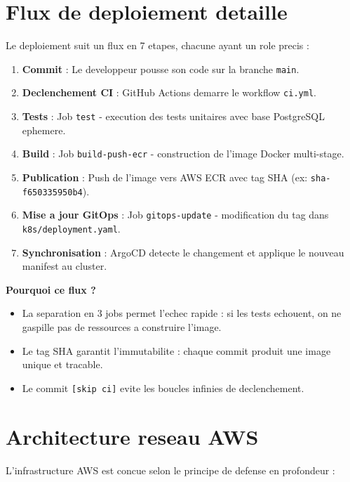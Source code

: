 \documentclass[12pt,a4paper,french]{report}
\begin{document}
\section{Flux de deploiement detaille}

Le deploiement suit un flux en 7 etapes, chacune ayant un role precis :

\begin{enumerate}
    \item \textbf{Commit} : Le developpeur pousse son code sur la branche \texttt{main}.
    \item \textbf{Declenchement CI} : GitHub Actions demarre le workflow \texttt{ci.yml}.
    \item \textbf{Tests} : Job \texttt{test} - execution des tests unitaires avec base PostgreSQL ephemere.
    \item \textbf{Build} : Job \texttt{build-push-ecr} - construction de l'image Docker multi-stage.
    \item \textbf{Publication} : Push de l'image vers AWS ECR avec tag SHA (ex: \texttt{sha-f650335950b4}).
    \item \textbf{Mise a jour GitOps} : Job \texttt{gitops-update} - modification du tag dans \texttt{k8s/deployment.yaml}.
    \item \textbf{Synchronisation} : ArgoCD detecte le changement et applique le nouveau manifest au cluster.
\end{enumerate}

\textbf{Pourquoi ce flux ?}
\begin{itemize}
    \item La separation en 3 jobs permet l'echec rapide : si les tests echouent, on ne gaspille pas de ressources a construire l'image.
    \item Le tag SHA garantit l'immutabilite : chaque commit produit une image unique et tracable.
    \item Le commit \texttt{[skip ci]} evite les boucles infinies de declenchement.
\end{itemize}

\section{Architecture reseau AWS}

L'infrastructure AWS est concue selon le principe de defense en profondeur :
\end{document}
